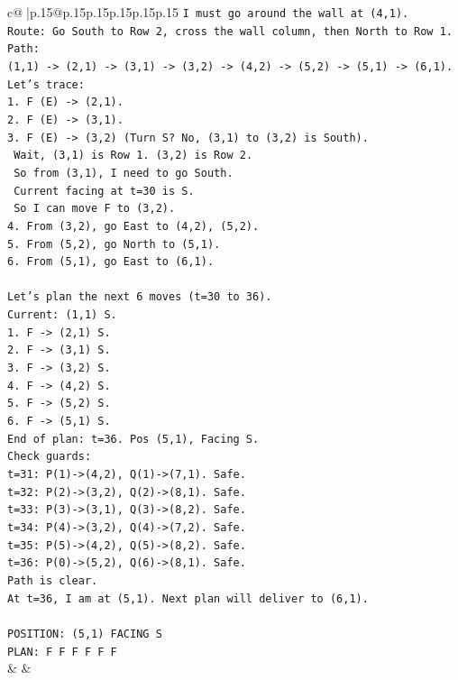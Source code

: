 \documentclass{article}
\begin{document}
{\begin{supertabular}{c@{$\;$}|p{.15\linewidth}@{}p{.15\linewidth}p{.15\linewidth}p{.15\linewidth}p{.15\linewidth}p{.15\linewidth}}
{{{\texttt{I must go around the wall at (4,1).} \\
\texttt{Route: Go South to Row 2, cross the wall column, then North to Row 1.} \\
\texttt{Path:} \\
\texttt{(1,1) {-}> (2,1) {-}> (3,1) {-}> (3,2) {-}> (4,2) {-}> (5,2) {-}> (5,1) {-}> (6,1).} \\
\texttt{Let's trace:} \\
\texttt{1. F (E) {-}> (2,1).} \\
\texttt{2. F (E) {-}> (3,1).} \\
\texttt{3. F (E) {-}> (3,2) (Turn S? No, (3,1) to (3,2) is South).} \\
\texttt{   Wait, (3,1) is Row 1. (3,2) is Row 2.} \\
\texttt{   So from (3,1), I need to go South.} \\
\texttt{   Current facing at t=30 is S.} \\
\texttt{   So I can move F to (3,2).} \\
\texttt{4. From (3,2), go East to (4,2), (5,2).} \\
\texttt{5. From (5,2), go North to (5,1).} \\
\texttt{6. From (5,1), go East to (6,1).} \\
\\ 
\texttt{Let's plan the next 6 moves (t=30 to 36).} \\
\texttt{Current: (1,1) S.} \\
\texttt{1. F {-}> (2,1) S.} \\
\texttt{2. F {-}> (3,1) S.} \\
\texttt{3. F {-}> (3,2) S.} \\
\texttt{4. F {-}> (4,2) S.} \\
\texttt{5. F {-}> (5,2) S.} \\
\texttt{6. F {-}> (5,1) S.} \\
\texttt{End of plan: t=36. Pos (5,1), Facing S.} \\
\texttt{Check guards:} \\
\texttt{t=31: P(1){-}>(4,2), Q(1){-}>(7,1). Safe.} \\
\texttt{t=32: P(2){-}>(3,2), Q(2){-}>(8,1). Safe.} \\
\texttt{t=33: P(3){-}>(3,1), Q(3){-}>(8,2). Safe.} \\
\texttt{t=34: P(4){-}>(3,2), Q(4){-}>(7,2). Safe.} \\
\texttt{t=35: P(5){-}>(4,2), Q(5){-}>(8,2). Safe.} \\
\texttt{t=36: P(0){-}>(5,2), Q(6){-}>(8,1). Safe.} \\
\texttt{Path is clear.} \\
\texttt{At t=36, I am at (5,1). Next plan will deliver to (6,1).} \\
\\ 
\texttt{POSITION: (5,1) FACING S} \\
\texttt{PLAN: F F F F F F} \\
            }
        }
    }
    & & \\ \\


\end{supertabular}}
\end{document}
